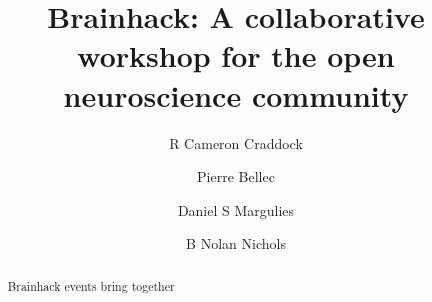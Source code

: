 \documentclass[11pt]{bmc_article_s50}
\begin{document}
\title{Brainhack: A collaborative workshop for the open neuroscience community}

\maketitle

\author[1,2*]{R Cameron Craddock}\cor{}
\author[3]{Pierre Bellec}
\author[4]{Daniel S Margulies}
\author[4]{B Nolan Nichols}

\address[1]{
  Computational Neuroimaging Lab, Center for Biomedical Imaging and \\\hspace*{59pt}Neuromodulation, Nathan S. Kline Institute for Psychiatric Research, \\\hspace*{59pt}140 Old Orangeburg Rd, 10962, Orangeburg, New York, USA
}
\address[2]{
  Center for the Developing Brain, Child Mind Institute, 445 Park Ave,\\\hspace*{59pt} 10022, New York, New York, USA
}

\address[3]{Centre de recherche de l’institut de g\'{e}riatrie de   Montr\'{e}al, Montr\'{e}al, QC, Canada
}

\address[4]{
  Max Planck Research Group for Neuroanatomy \& Connectivity,\\\hspace*{59pt} Max Planck Institute for Human Cognitive and Brain Sciences, \\\hspace*{59pt} Stephanstraße 1A, 04103, Leipzig, Germany
}

\address[5]{
  SRI International, 333 Ravenswood Ave, 94025, Menlo Park,  California, USA
}
  
\address[6]{
  Department of Psychiatry and Behavioral Sciences, Stanford University,\\\hspace*{59pt} 
  1265 Welch Road, 94306, Stanford,  California, USA
}


\begin{abstract} %
Brainhack events bring together 

\end{abstract}


\end{document}
